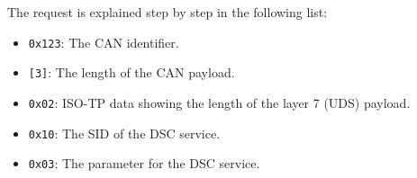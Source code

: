 The request is explained step by step in the following list:

\begin{itemize}
    \item \texttt{0x123}: The CAN identifier.
    \item \texttt{[3]}: The length of the CAN payload.
    \item \texttt{0x02}: ISO-TP data showing the length of the layer 7 (UDS) payload.
    \item \texttt{0x10}: The SID of the DSC service.
    \item \texttt{0x03}: The parameter for the DSC service.
\end{itemize}
